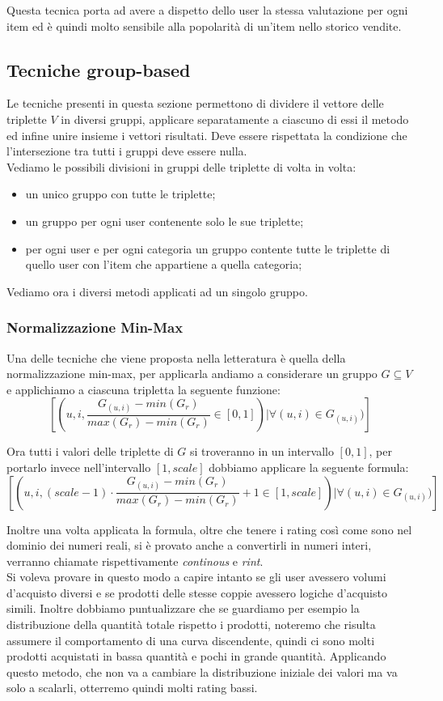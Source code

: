 Questa tecnica porta ad avere a dispetto dello user la stessa valutazione per ogni item ed è quindi molto sensibile alla popolarità di un'item nello storico vendite.

\subsection{Tecniche group-based}
Le tecniche presenti in questa sezione permettono di dividere il vettore delle triplette $V$ in diversi gruppi, applicare separatamente a ciascuno di essi il metodo ed infine unire insieme i vettori risultati. 
Deve essere rispettata la condizione che l'intersezione tra tutti i gruppi deve essere nulla.\\
Vediamo le possibili divisioni in gruppi delle triplette di volta in volta:
\begin{itemize}
    \item un unico gruppo con tutte le triplette;
    \item un gruppo per ogni user contenente solo le sue triplette;
    \item per ogni user e per ogni categoria un gruppo contente tutte le triplette di quello user con l'item che appartiene a quella categoria;
\end{itemize}

Vediamo ora i diversi metodi applicati ad un singolo gruppo.
\subsubsection{Normalizzazione Min-Max}
Una delle tecniche che viene proposta nella letteratura è quella della normalizzazione min-max, per applicarla andiamo a considerare un gruppo $G \subseteq V$ e applichiamo a ciascuna tripletta la seguente funzione:
$$[(u, i, \frac{G_{(u,i)} - min(G_r)}{max(G_r) - min(G_r)} \in [0,1]) |  \forall (u,i) \in G_{(u,i)})]$$

Ora tutti i valori delle triplette di $G$ si troveranno in un intervallo $[0,1]$, per portarlo invece nell'intervallo $[1,scale]$ dobbiamo applicare la seguente formula:
$$[(u, i, (scale -1) \cdot \frac{G_{(u,i)} - min(G_r)}{max(G_r) - min(G_r)} + 1 \in [1,scale]) |  \forall (u,i) \in G_{(u,i)})]$$

Inoltre una volta applicata la formula, oltre che tenere i rating così come sono nel dominio dei numeri reali, si è provato anche a convertirli in numeri interi, verranno chiamate rispettivamente \textit{continous} e \textit{rint}.\\
Si voleva provare in questo modo a capire intanto se gli user avessero volumi d'acquisto diversi e se prodotti delle stesse coppie avessero logiche d'acquisto simili. 
Inoltre dobbiamo puntualizzare che se guardiamo per esempio la distribuzione della quantità totale rispetto i prodotti, noteremo che risulta assumere il comportamento di una curva discendente, quindi ci sono molti prodotti acquistati in bassa quantità e pochi in grande quantità. Applicando questo metodo, che non va a cambiare la distribuzione iniziale dei valori ma va solo a scalarli, otterremo quindi molti rating bassi.

